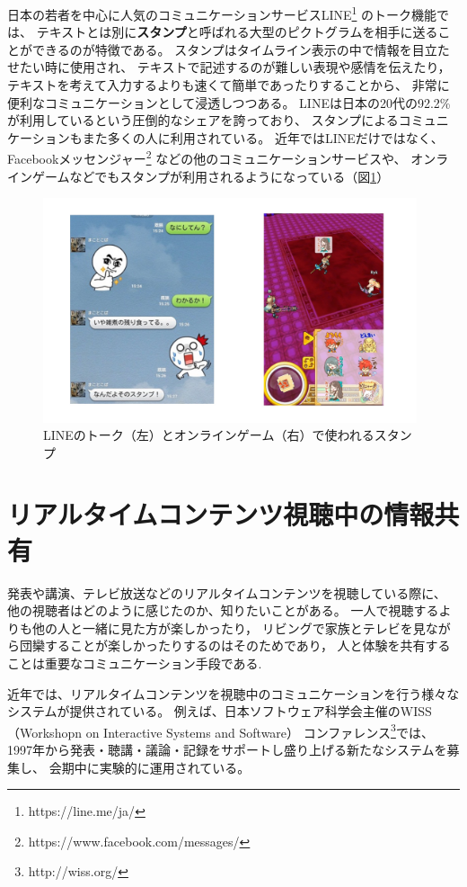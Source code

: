 日本の若者を中心に人気のコミュニケーションサービスLINE\footnote{\textsf{https://line.me/ja/}}
のトーク機能では、
テキストとは別に{\bf スタンプ}と呼ばれる大型のピクトグラムを相手に送ることができるのが特徴である。
スタンプはタイムライン表示の中で情報を目立たせたい時に使用され、
テキストで記述するのが難しい表現や感情を伝えたり，
テキストを考えて入力するよりも速くて簡単であったりすることから、
非常に便利なコミュニケーションとして浸透しつつある。
LINEは日本の20代の92.2\%が利用しているという圧倒的なシェアを誇っており\cite{soumu27}、
スタンプによるコミュニケーションもまた多くの人に利用されている\cite{40020496489}。
近年ではLINEだけではなく、Facebookメッセンジャー\footnote{\textsf{https://www.facebook.com/messages/}}
などの他のコミュニケーションサービスや、
オンラインゲームなどでもスタンプが利用されるようになっている（図\ref{gamestamp}）

\begin{figure}[H]
\centering
\includegraphics[width=11cm]{images/gamestamp.png}
\caption{LINEのトーク（左）とオンラインゲーム（右）で使われるスタンプ}
\label{gamestamp}
\end{figure}


\section{リアルタイムコンテンツ視聴中の情報共有}

発表や講演、テレビ放送などのリアルタイムコンテンツを視聴している際に、
他の視聴者はどのように感じたのか、知りたいことがある。
一人で視聴するよりも他の人と一緒に見た方が楽しかったり，
リビングで家族とテレビを見ながら団欒することが楽しかったりするのはそのためであり，
人と体験を共有することは重要なコミュニケーション手段である.

近年では、リアルタイムコンテンツを視聴中のコミュニケーションを行う様々なシステムが提供されている。
例えば、日本ソフトウェア科学会主催のWISS（Workshopn on Interactive Systems and Software）
コンファレンス\footnote{\textsf{http://wiss.org/}}では、
1997年から発表・聴講・議論・記録をサポートし盛り上げる新たなシステムを募集し、
会期中に実験的に運用されている\cite{wiss_challenge}。

